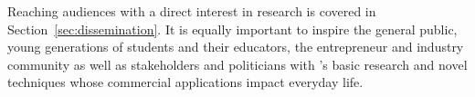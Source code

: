 






Reaching audiences with a direct interest in \acronym research is covered in Section~\ref{sec:dissemination}. 
It is equally important to inspire the general public, young generations of students and their educators, the entrepreneur and industry community as well as stakeholders and politicians with \acronym's basic research and novel techniques whose commercial applications impact everyday life. 

